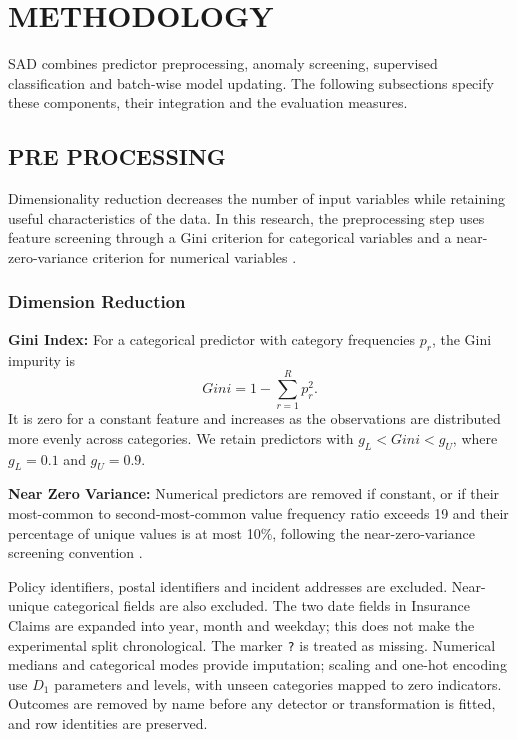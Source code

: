 \section{METHODOLOGY}\label{SC:METHOD}\label{sec:methods}
SAD combines predictor preprocessing, anomaly screening, supervised
classification and batch-wise model updating. The following subsections
specify these components, their integration and the evaluation measures.

\subsection{PRE PROCESSING}\label{SSC:PreProcessing}
Dimensionality reduction decreases the number of input variables while
retaining useful characteristics of the data. In this research, the
preprocessing step uses feature screening through a Gini criterion for
categorical variables and a near-zero-variance criterion for numerical
variables \citep{Hastie2009,Kuhn2008}.

\subsubsection*{Dimension Reduction}
\textbf{Gini Index:} For a categorical predictor with category frequencies
$p_r$, the Gini impurity is
\[
Gini=1-\sum_{r=1}^{R}p_r^2.
\]
It is zero for a constant feature and increases as the observations are
distributed more evenly across categories. We retain predictors with
$g_L<Gini<g_U$, where $g_L=0.1$ and $g_U=0.9$.

\textbf{Near Zero Variance:} Numerical predictors are removed if constant,
or if their most-common to second-most-common value frequency ratio exceeds
19 and their percentage of unique values is at most 10\%, following the
near-zero-variance screening convention \citep{Kuhn2008}.



\begin{revised}
Policy identifiers, postal identifiers and incident addresses are excluded.
Near-unique categorical fields are also excluded. The two date fields in
Insurance Claims are expanded into year, month and weekday; this does not
make the experimental split chronological. The marker \texttt{?} is treated
as missing. Numerical medians and categorical modes provide imputation;
scaling and one-hot encoding use $D_1$ parameters and levels, with unseen
categories mapped to zero indicators. Outcomes are removed by name before
any detector or transformation is fitted, and row identities are preserved.
\end{revised}

